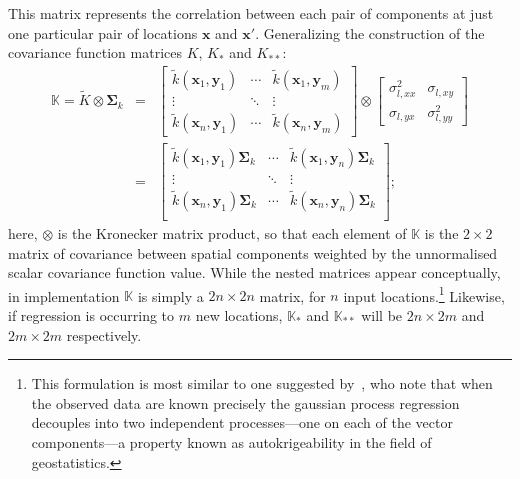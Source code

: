 \documentclass[manuscript]{aastex}
\newcommand{\bsS}{\boldsymbol\Sigma}
\begin{document}
This matrix represents the correlation between each pair of components at just one particular pair of locations $\mathbf{x}$ and $\mathbf{x}'$. Generalizing the construction of the covariance function matrices $K$, $K_\ast$ and $K_{\ast\ast}$:
\begin{eqnarray}
\mathbb{K} = \tilde{K} \otimes \bsS_k & = & \left[\begin{array}{cccc}
\tilde{k}(\mathbf{x}_1,\mathbf{y}_1)  & \cdots & \tilde{k}(\mathbf{x}_1,\mathbf{y}_m) \\
\vdots&\ddots&\vdots \\
\tilde{k}(\mathbf{x}_n,\mathbf{y}_1)&\cdots& \tilde{k}(\mathbf{x}_n,\mathbf{y}_m)
\end{array}\right] \otimes \left[\begin{array}{cc}
\sigma_{l,xx}^2 & \sigma_{l,xy} \\
\sigma_{l,yx} & \sigma_{l,yy}^2
\end{array} \right] \\
& = & 
\left[\begin{array}{ccc}
\tilde{k}(\mathbf{x}_1,\mathbf{y}_1)\bsS_k &\cdots & \tilde{k}(\mathbf{x}_1,\mathbf{y}_n)\bsS_k \\
\vdots & \ddots &\vdots \\
\tilde{k}(\mathbf{x}_n,\mathbf{y}_1)\bsS_k &\cdots & \tilde{k}(\mathbf{x}_n,\mathbf{y}_n)\bsS_k \\
\end{array}\right];
\end{eqnarray}
here, $\otimes$ is the Kronecker matrix product, so that each element of $\mathbb{K}$ is the $2\times2$ matrix of covariance between spatial components weighted by the unnormalised scalar covariance function value. While the nested matrices appear conceptually, in implementation $\mathbb{K}$ is simply a $2n\times2n$ matrix, for $n$ input locations.\footnote{This formulation is most similar to one suggested by~\citet{bonilla-et-al-nips-07}, who note that when the observed data are known precisely the gaussian process regression decouples into two independent processes---one on each of the vector components---a property known as autokrigeability in the field of geostatistics.} Likewise, if regression is occurring to $m$ new locations, $\mathbb{K}_\ast$ and $\mathbb{K}_{\ast\ast}$ will be $2n\times2m$ and $2m\times2m$ respectively.
\end{document}
